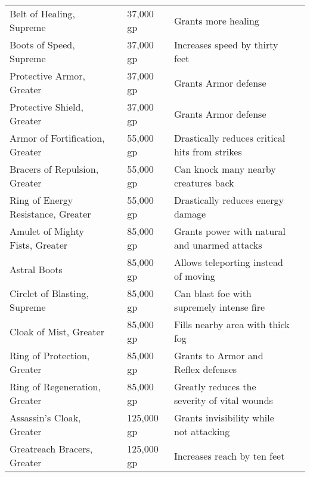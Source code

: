 \begin{longtabuwrapper}
\begin{longtabu}{l l l X l}
Belt of Healing, Supreme &  & 37,000 gp & Grants more healing & \pageref{item:Belt of Healing, Supreme} \\
Boots of Speed, Supreme &  & 37,000 gp & Increases speed by thirty feet & \pageref{item:Boots of Speed, Supreme} \\
Protective Armor, Greater &  & 37,000 gp & Grants  Armor defense & \pageref{item:Protective Armor, Greater} \\
Protective Shield, Greater &  & 37,000 gp & Grants  Armor defense & \pageref{item:Protective Shield, Greater} \\
Armor of Fortification, Greater &  & 55,000 gp & Drastically reduces critical hits from strikes & \pageref{item:Armor of Fortification, Greater} \\
Bracers of Repulsion, Greater &  & 55,000 gp & Can knock many nearby creatures back & \pageref{item:Bracers of Repulsion, Greater} \\
Ring of Energy Resistance, Greater &  & 55,000 gp & Drastically reduces energy damage & \pageref{item:Ring of Energy Resistance, Greater} \\
Amulet of Mighty Fists, Greater &  & 85,000 gp & Grants  power with natural and unarmed attacks & \pageref{item:Amulet of Mighty Fists, Greater} \\
Astral Boots &  & 85,000 gp & Allows teleporting instead of moving & \pageref{item:Astral Boots} \\
Circlet of Blasting, Supreme &  & 85,000 gp & Can blast foe with supremely intense fire & \pageref{item:Circlet of Blasting, Supreme} \\
Cloak of Mist, Greater &  & 85,000 gp & Fills nearby area with thick fog & \pageref{item:Cloak of Mist, Greater} \\
Ring of Protection, Greater &  & 85,000 gp & Grants  to Armor and Reflex defenses & \pageref{item:Ring of Protection, Greater} \\
Ring of Regeneration, Greater &  & 85,000 gp & Greatly reduces the severity of vital wounds & \pageref{item:Ring of Regeneration, Greater} \\
Assassin's Cloak, Greater &  & 125,000 gp & Grants invisibility while not attacking & \pageref{item:Assassin's Cloak, Greater} \\
Greatreach Bracers, Greater &  & 125,000 gp & Increases reach by ten feet & \pageref{item:Greatreach Bracers, Greater} \\

\end{longtabu}
\end{longtabuwrapper}
